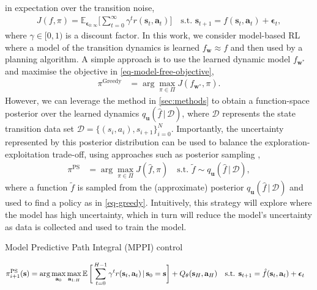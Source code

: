 \documentclass{article}
\newcommand{\state}{\ensuremath{\mathbf{s}}}
\newcommand{\action}{\ensuremath{\mathbf{a}}}
\newcommand{\noise}{\ensuremath{\bm\epsilon}}
\newcommand{\discount}{\ensuremath{\gamma}}
\newcommand{\dataset}{\ensuremath{\mathcal{D}}}
\newcommand{\Horizon}{\ensuremath{H}}
\newcommand{\rewardFn}{\ensuremath{r}}
\newcommand{\transitionFn}{\ensuremath{f}}
\newcommand{\policy}{\ensuremath{\pi}}
\renewcommand{\mid}{\,|\,}
\begin{document}
in expectation over the transition noise,
\begin{align} \label{eq-model-free-objective}
J(\transitionFn, \policy) = \mathbb{E}_{\noise_{0:\infty}} \bigg[ \sum_{t=0}^{\infty} \discount^{t} \rewardFn(\state_{t},\action_{t}) \bigg]
\quad \text{s.t. } \state_{t+1} = \transitionFn(\state_{t}, \action_{t}) + \noise_{t},
\end{align}
where $\gamma \in [0, 1)$ is a discount factor.
In this work, we consider model-based RL where a model of the transition dynamics is learned \(f_{\mathbf{w}} \approx \transitionFn\) and then used by a planning algorithm.
A simple approach is to use the learned dynamic model $f_{\mathbf{w}^{*}}$ and maximise the objective in \cref{eq-model-free-objective},
\begin{align} \label{eq-greedy}
  \policy^{\text{Greedy}} &= \arg \max_{\pi \in \Pi} J(f_{\mathbf{w}^{*}}, \pi).
\end{align}
However, we can leverage the method in \cref{sec:methods} to obtain a function-space posterior over the learned dynamics $q_{\mathbf{u}}(\hat{\transitionFn} \mid \dataset)$,
where $\mathcal{D}$ represents the state transition data set \(\mathcal{D} = \{(s_{i},a_{i}), s_{i+1}\}_{i=0}^{N}\).
Importantly, the uncertainty represented by this posterior distribution can be used to balance the exploration-exploitation trade-off,
using approaches such as posterior sampling \cite{osbandWhyPosteriorSampling2017,osbandMoreEfficientReinforcement2013},
\begin{align} \label{eq-posterior-sampling}
  \policy^{\text{PS}} &= \arg \max_{\pi \in \Pi} J(\hat{f}, \pi)
\quad \text{s.t. } \tilde{\transitionFn} \sim q_{\mathbf{u}}(\hat{\transitionFn} \mid \dataset),
\end{align}
where a function $\tilde{\transitionFn}$ is sampled from the (approximate) posterior $q_{\mathbf{u}}(\hat{\transitionFn} \mid \dataset)$ and used to find a policy as
in \cref{eq-greedy}.
Intuitively, this strategy will explore where the model has high uncertainty, which in turn will reduce the model's uncertainty as data is collected and used to
train the model.



Model Predictive Path Integral (MPPI) control
\cite{panSample2015}
\cite{williamsModel2017}

\begin{align} \label{eq-fast-update-mpc}
  \policy_{i+1}^{\text{PS}}(\state) = \arg \max_{\action_{0}} \max_{\action_{1:\Horizon}}
\E \bigg[ \sum_{t=0}^{H-1} \gamma^{t} r(\state_{t},\action_{t}) \mid \state_{0}=\state  \bigg] + Q_{\theta}(\state_{\Horizon}, \action_{H})
\quad \text{s.t. } \state_{t+1} &= \hat{\transitionFn}(\state_{t}, \action_{t}) + \noise_{t}
\end{align}
\end{document}
